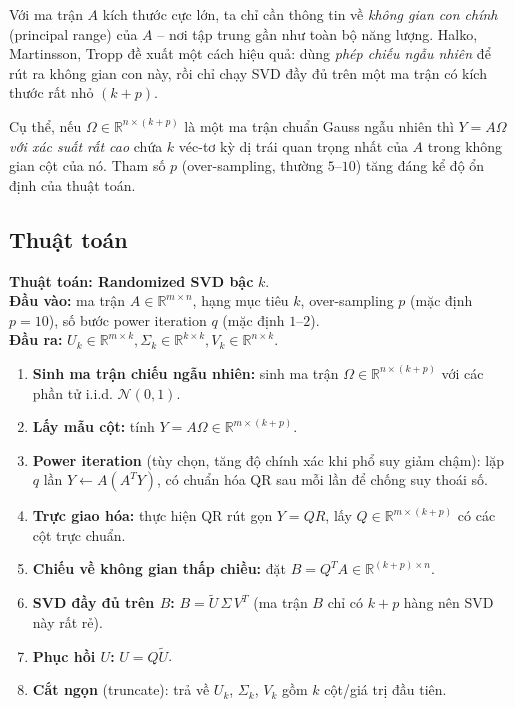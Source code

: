 Với ma trận $A$ kích thước cực lớn, ta chỉ cần thông tin về \emph{không gian
con chính} (principal range) của $A$ -- nơi tập trung gần như toàn bộ năng
lượng. Halko, Martinsson, Tropp \cite{halko2011} đề xuất một cách hiệu quả:
dùng \emph{phép chiếu ngẫu nhiên} để rút ra không gian con này, rồi chỉ chạy
SVD đầy đủ trên một ma trận có kích thước rất nhỏ $(k+p)$.

Cụ thể, nếu $\Omega \in \mathbb{R}^{n\times(k+p)}$ là một ma trận chuẩn Gauss ngẫu
nhiên thì $Y = A\Omega$ \emph{với xác suất rất cao} chứa $k$ véc-tơ kỳ dị trái
quan trọng nhất của $A$ trong không gian cột của nó. Tham số $p$ (over-sampling,
thường $5$--$10$) tăng đáng kể độ ổn định của thuật toán.

\subsection{Thuật toán}

\begin{mdframed}[backgroundcolor=black!5]
\textbf{Thuật toán: Randomized SVD bậc} $k$.\\[2pt]
\textbf{Đầu vào:} ma trận $A \in \mathbb{R}^{m\times n}$, hạng mục tiêu $k$, over-sampling $p$
(mặc định $p=10$), số bước power iteration $q$ (mặc định $1$--$2$).\\
\textbf{Đầu ra:} $U_k \in \mathbb{R}^{m\times k}, \Sigma_k \in \mathbb{R}^{k\times k}, V_k \in \mathbb{R}^{n\times k}$.

\smallskip
\begin{enumerate}
    \item \textbf{Sinh ma trận chiếu ngẫu nhiên:} sinh ma trận
    $\Omega \in \mathbb{R}^{n\times(k+p)}$ với các phần tử i.i.d. $\mathcal{N}(0,1)$.
    \item \textbf{Lấy mẫu cột:} tính $Y = A\Omega \in \mathbb{R}^{m\times(k+p)}$.
    \item \textbf{Power iteration} (tùy chọn, tăng độ chính xác khi phổ
    suy giảm chậm): lặp $q$ lần $Y \leftarrow A(A^T Y)$, có chuẩn hóa QR
    sau mỗi lần để chống suy thoái số.
    \item \textbf{Trực giao hóa:} thực hiện QR rút gọn $Y = Q R$, lấy
    $Q \in \mathbb{R}^{m\times(k+p)}$ có các cột trực chuẩn.
    \item \textbf{Chiếu về không gian thấp chiều:} đặt $B = Q^T A \in \mathbb{R}^{(k+p)\times n}$.
    \item \textbf{SVD đầy đủ trên $B$:} $B = \widetilde{U}\,\Sigma\,V^T$
    (ma trận $B$ chỉ có $k+p$ hàng nên SVD này rất rẻ).
    \item \textbf{Phục hồi $U$:} $U = Q\widetilde{U}$.
    \item \textbf{Cắt ngọn} (truncate): trả về $U_k$, $\Sigma_k$, $V_k$ gồm
    $k$ cột/giá trị đầu tiên.
\end{enumerate}
\end{mdframed}

